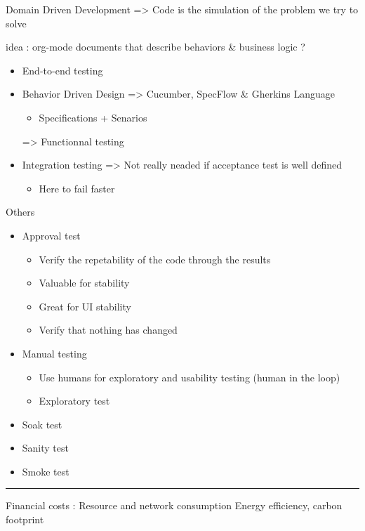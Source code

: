 \documentclass[a4paper,12pt]{article}
\begin{document}
\begin{multicols}{2}
Domain Driven Development
=> Code is the simulation of the problem we try to solve

idea : org-mode documents that describe behaviors \& business logic ?

\begin{itemize}
\item End-to-end testing

\item Behavior Driven Design
=> Cucumber, SpecFlow \& Gherkins Language
\begin{itemize}
\item Specifications + Senarios
\end{itemize}

=> Functionnal testing

\item Integration testing => Not really neaded if acceptance test is well defined
\begin{itemize}
\item Here to fail faster
\end{itemize}
\end{itemize}

Others
\begin{itemize}
\item Approval test
\begin{itemize}
\item Verify the repetability of the code through the results
\item Valuable for stability
\item Great for UI stability
\item Verify that nothing has changed
\end{itemize}

\item Manual testing
\begin{itemize}
\item Use humans for exploratory and usability testing (human in the loop)
\item Exploratory test
\end{itemize}

\item Soak test
\item Sanity test
\item Smoke test
\end{itemize}

\noindent\rule{\textwidth}{0.5pt}
Financial costs : Resource and network consumption
Energy efficiency, carbon footprint


\end{multicols}
\end{document}
